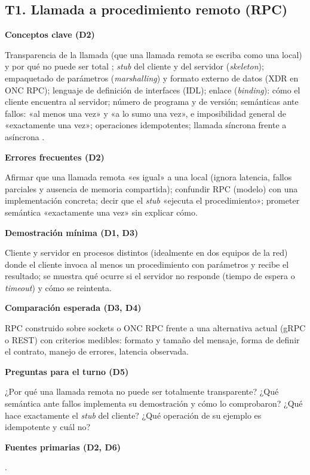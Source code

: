 \documentclass[11pt,a4paper]{article}
\newcommand{\campo}[1]{\par\smallskip\textbf{\color{uteqBlue}#1}\par}
\begin{document}
\subsection{T1. Llamada a procedimiento remoto (RPC)}
\begin{fichaBox}[title={Ficha T1 --- RPC}]
	\campo{Conceptos clave (D2)}
	Transparencia de la llamada (que una llamada remota se escriba como una local) y por qué no puede ser total \cite{waldo1997note}; \emph{stub} del cliente y del servidor (\emph{skeleton}); empaquetado de parámetros (\emph{marshalling}) y formato externo de datos (XDR en ONC RPC); lenguaje de definición de interfaces (IDL); enlace (\emph{binding}): cómo el cliente encuentra al servidor; número de programa y de versión; semánticas ante fallos: «al menos una vez» y «a lo sumo una vez», e imposibilidad general de «exactamente una vez»; operaciones idempotentes; llamada síncrona frente a asíncrona \cite{birrell1984rpc,rfc5531,vansteen2023distributed}.
	\campo{Errores frecuentes (D2)}
	Afirmar que una llamada remota «es igual» a una local (ignora latencia, fallos parciales y ausencia de memoria compartida); confundir RPC (modelo) con una implementación concreta; decir que el \emph{stub} «ejecuta el procedimiento»; prometer semántica «exactamente una vez» sin explicar cómo.
	\campo{Demostración mínima (D1, D3)}
	Cliente y servidor en procesos distintos (idealmente en dos equipos de la red) donde el cliente invoca al menos un procedimiento con parámetros y recibe el resultado; se muestra qué ocurre si el servidor no responde (tiempo de espera o \emph{timeout}) y cómo se reintenta.
	\campo{Comparación esperada (D3, D4)}
	RPC construido sobre sockets o ONC RPC frente a una alternativa actual (gRPC o REST) con criterios medibles: formato y tamaño del mensaje, forma de definir el contrato, manejo de errores, latencia observada.
	\campo{Preguntas para el turno (D5)}
	¿Por qué una llamada remota no puede ser totalmente transparente? ¿Qué semántica ante fallos implementa su demostración y cómo lo comprobaron? ¿Qué hace exactamente el \emph{stub} del cliente? ¿Qué operación de su ejemplo es idempotente y cuál no?
	\campo{Fuentes primarias (D2, D6)}
	\cite{birrell1984rpc,rfc5531,waldo1997note,seemakhupt2023rpc,vansteen2023distributed}.
\end{fichaBox}

\end{document}
